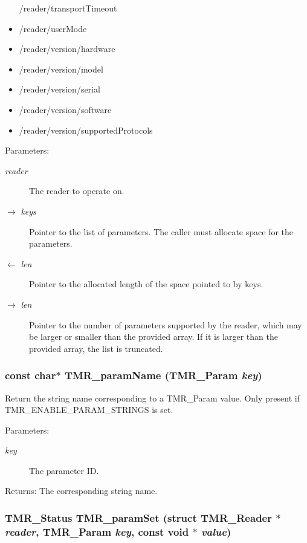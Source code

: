 \begin{itemize}
/reader/transportTimeout \item /reader/userMode \item /reader/version/hardware \item /reader/version/model \item /reader/version/serial \item /reader/version/software \item /reader/version/supportedProtocols\end{itemize}
\begin{Desc}
\item[Parameters:]
\begin{description}
\item[{\em reader}]The reader to operate on. \item[\mbox{$\rightarrow$} {\em keys}]Pointer to the list of parameters. The caller must allocate space for the parameters. \item[\mbox{$\leftarrow$} {\em len}]Pointer to the allocated length of the space pointed to by keys. \item[\mbox{$\rightarrow$} {\em len}]Pointer to the number of parameters supported by the reader, which may be larger or smaller than the provided array. If it is larger than the provided array, the list is truncated. \end{description}
\end{Desc}
\hypertarget{group__reader_g73f896de4aa8cb256c33a771ab514460}{
\subsubsection[{TMR\_\-paramName}]{\setlength{\rightskip}{0pt plus 5cm}const char$\ast$ TMR\_\-paramName ({\bf TMR\_\-Param} {\em key})}}
\label{group__reader_g73f896de4aa8cb256c33a771ab514460}


Return the string name corresponding to a TMR\_\-Param value. Only present if TMR\_\-ENABLE\_\-PARAM\_\-STRINGS is set.

\begin{Desc}
\item[Parameters:]
\begin{description}
\item[{\em key}]The parameter ID. \end{description}
\end{Desc}
\begin{Desc}
\item[Returns:]The corresponding string name. \end{Desc}
\hypertarget{group__reader_gd8c8030610870c694ff19b9733799dbb}{
\subsubsection[{TMR\_\-paramSet}]{\setlength{\rightskip}{0pt plus 5cm}TMR\_\-Status TMR\_\-paramSet (struct {\bf TMR\_\-Reader} $\ast$ {\em reader}, \/  {\bf TMR\_\-Param} {\em key}, \/  const void $\ast$ {\em value})}}
\label{group__reader_gd8c8030610870c694ff19b9733799dbb}


